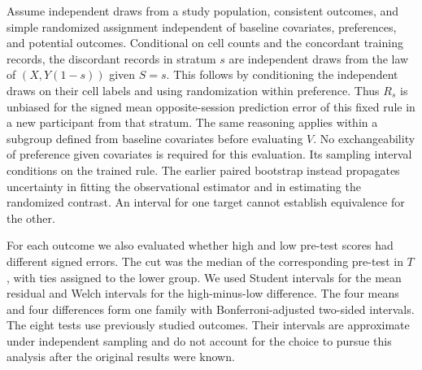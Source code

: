 Assume independent draws from a study population, consistent outcomes, and simple randomized assignment independent of baseline covariates, preferences, and potential outcomes. Conditional on cell counts and the concordant training records, the discordant records in stratum $s$ are independent draws from the law of $(X,Y(1-s))$ given $S=s$. This follows by conditioning the independent draws on their cell labels and using randomization within preference. Thus $R_s$ is unbiased for the signed mean opposite-session prediction error of this fixed rule in a new participant from that stratum. The same reasoning applies within a subgroup defined from baseline covariates before evaluating $V$. No exchangeability of preference given covariates is required for this evaluation. Its sampling interval conditions on the trained rule. The earlier paired bootstrap instead propagates uncertainty in fitting the observational estimator and in estimating the randomized contrast. An interval for one target cannot establish equivalence for the other.

For each outcome we also evaluated whether high and low pre-test scores had different signed errors. The cut was the median of the corresponding pre-test in $T$, with ties assigned to the lower group. We used Student intervals for the mean residual and Welch intervals for the high-minus-low difference. The four means and four differences form one family with Bonferroni-adjusted two-sided intervals. The eight tests use previously studied outcomes. Their intervals are approximate under independent sampling and do not account for the choice to pursue this analysis after the original results were known.

